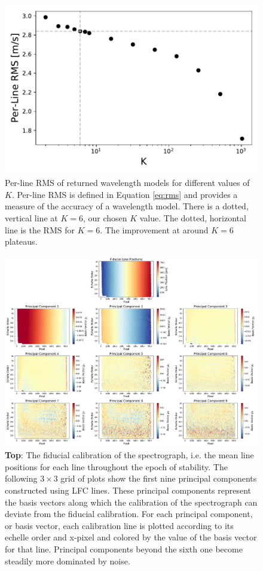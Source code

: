 \documentclass[modern]{aastex63}
\begin{document}
\begin{figure}[h]
\centering
\includegraphics[width=.5\textwidth]{Figures/kvals_all.pdf}
\caption{Per-line RMS of returned wavelength models for different values of $K$.  Per-line RMS is defined in Equation \ref{eq:rms} and provides a measure of the accuracy of a wavelength model.  There is a dotted, vertical line at $K=6$, our chosen $K$ value.  The dotted, horizontal line is the RMS for $K=6$.  The improvement at around $K=6$ plateaus.}
\label{fig:kvals}
\end{figure}

\begin{figure}[t]
\centering
\includegraphics[width=\textwidth]{Figures/pcsLfc9.png}
\caption{\textbf{Top}:  The fiducial calibration of the spectrograph, i.e. the mean line positions for each line throughout the epoch of stability.  The following $3 \times 3$ grid of plots show the first nine principal components constructed using LFC lines.  These principal components represent the basis vectors along which the calibration of the spectrograph can deviate from the fiducial calibration.  For each principal component, or basis vector, each calibration line is plotted according to its echelle order and x-pixel and colored by the value of the basis vector for that line.  Principal components beyond the sixth one become steadily more dominated by noise.}
\label{fig:pcLfc}
\end{figure}
\end{document}
